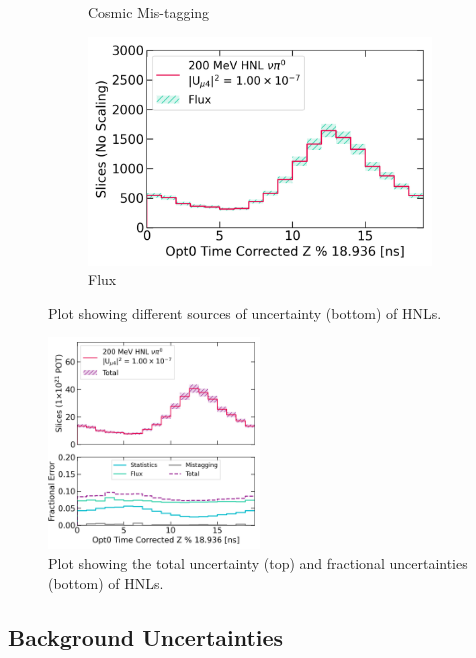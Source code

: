 \begin{figure}[htbp!]
\begin{subfigure}[b]{0.495\textwidth}
            \caption{Cosmic Mis-tagging}%
            \label{fig:hnl_mistag}
        \end{subfigure}
        \centering
        \begin{subfigure}[b]{0.495\textwidth}   
            \centering 
            \includegraphics[width=\textwidth]{hnl_flux_error}
            \caption{Flux}%
            \label{fig:hnl_flux}
        \end{subfigure}
        \caption{
	Plot showing different sources of uncertainty (bottom) of HNLs.
	}
        \label{fig:hnl_error}
	\vspace{0.5cm}
\centering    
\includegraphics[width=0.5\textwidth]{hnl_error}
\caption[hnl_error]{
Plot showing the total uncertainty (top) and fractional uncertainties (bottom) of HNLs.
}
\label{fig:hnl_total_error}
\end{figure}

\subsection{Background Uncertainties}

